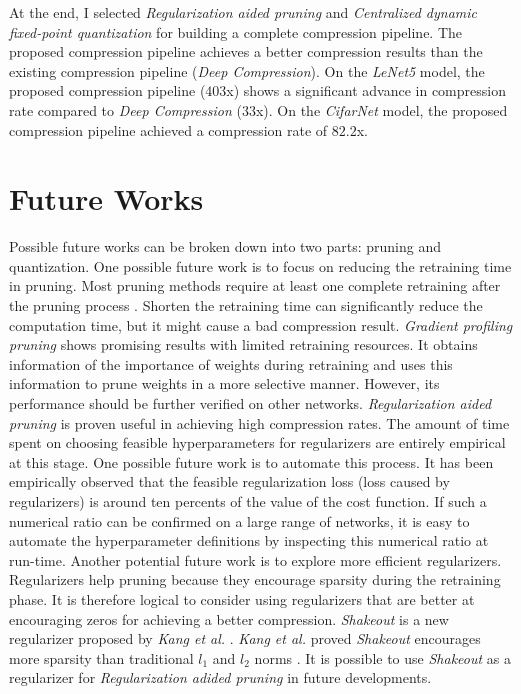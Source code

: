 \documentclass[a4paper,12pt]{report}
\begin{document}
At the end, I selected \textit{Regularization aided pruning} and \textit{Centralized dynamic fixed-point
quantization}
for building a complete compression pipeline.
The proposed compression pipeline achieves a better compression results than the
existing compression pipeline (\textit{Deep Compression}).
On the \textit{LeNet5} model, the proposed compression pipeline ($403$x) shows a significant
advance in compression rate compared to \textit{Deep Compression} ($33$x).
On the \textit{CifarNet} model, the proposed compression pipeline achieved a
compression rate of $82.2$x.

\section{Future Works}
Possible future works can be broken down into two parts: pruning and quantization.
One possible future work is to focus on reducing the retraining time in pruning.
Most pruning methods require at least one complete retraining after the pruning
process \cite{Thimm, Li2016}.
Shorten the retraining time can significantly reduce the computation time,
but it might cause a bad compression result.
\textit{Gradient profiling pruning} shows promising results with limited retraining
resources.
It obtains information of the importance of weights during retraining and uses this
information to prune weights in a more selective manner.
However, its performance should be further verified on other networks.
\textit{Regularization aided pruning} is proven useful in achieving high
compression rates.
The amount of time spent on choosing feasible hyperparameters for regularizers
are entirely empirical at this stage.
One possible future work is to automate this process.
It has been empirically observed that the feasible regularization loss (loss caused by regularizers)
is around ten percents of the value of the cost function.
If such a numerical ratio can be confirmed on a large range of networks, it is
easy to automate the hyperparameter definitions by inspecting this numerical ratio
at run-time.
Another potential future work is to explore more efficient regularizers.
Regularizers help pruning because they encourage sparsity during the retraining
phase.
It is therefore logical to consider using regularizers that are better at
encouraging zeros for achieving a better compression.
\textit{Shakeout} is a new regularizer proposed by \textit{Kang et al.} \cite{Kang}.
\textit{Kang et al.} proved \textit{Shakeout} encourages more sparsity than
traditional $l_1$ and $l_2$ norms \cite{Kang}.
It is possible to use \textit{Shakeout} as a regularizer for \textit{Regularization adided pruning}
in future developments.
\end{document}
